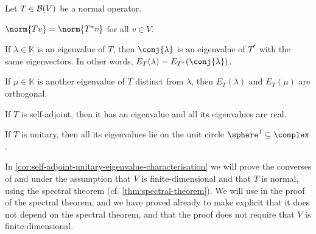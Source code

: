 \documentclass[a4paper, 11pt]{memoir}
\numberwithin{equation}{chapter}
\begin{document}
\begin{proposition}
    Let $T \in \mathcal{B}(V)$ be a normal operator.
    \begin{enumprop}
        \item \label{enum:normal-adjoint-norm} $\norm{Tv} = \norm{T^*v}$ for all $v \in V$.
        
        \item \label{enum:normal-adjoint-eigenvalues} If $\lambda \in \mathbb{K}$ is an eigenvalue of $T$, then $\conj{\lambda}$ is an eigenvalue of $T^*$ with the same eigenvectors. In other words, $E_T(\lambda) = E_{T^*}(\conj{\lambda})$.

        \item \label{enum:normal-orthogonal-eigenspaces} If $\mu \in \mathbb{K}$ is another eigenvalue of $T$ distinct from $\lambda$, then $E_T(\lambda)$ and $E_T(\mu)$ are orthogonal.

        \item \label{enum:self-adjoint-eigenvalues-exists-and-real} If $T$ is self-adjoint, then it has an eigenvalue and all its eigenvalues are real.

        \item \label{enum:unitary-eigenvalues-unit-circle} If $T$ is unitary, then all its eigenvalues lie on the unit circle $\sphere^1 \subseteq \complex$.
    \end{enumprop}
\end{proposition}
%
In \cref{cor:self-adjoint-unitary-eigenvalue-characterisation} we will prove the converses of  and  under the assumption that $V$ is finite-dimensional and that $T$ is normal, using the spectral theorem (cf. \cref{thm:spectral-theorem}). We will use  in the proof of the spectral theorem, and we have proved  already to make explicit that it does not depend on the spectral theorem, and that the proof does not require that $V$ is finite-dimensional.
\end{document}
